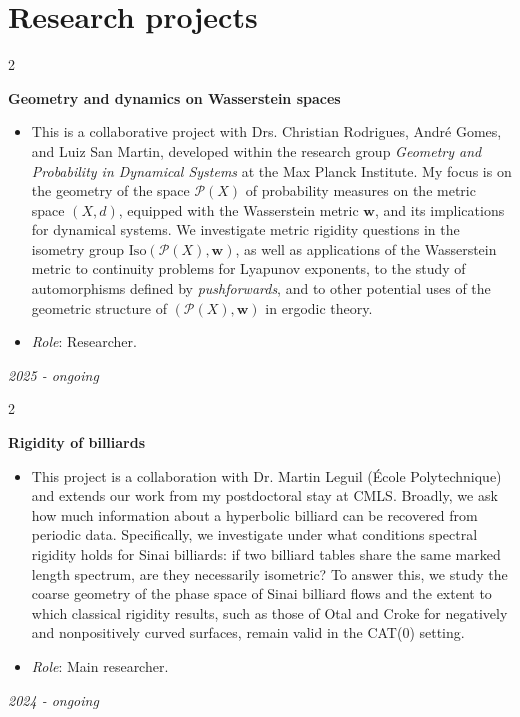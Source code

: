 \documentclass[10pt, letterpaper]{article}
\newenvironment{highlights}{
    \begin{itemize}[
        topsep=0.10 cm,
        parsep=0.10 cm,
        partopsep=0pt,
        itemsep=0pt,
        leftmargin=0.4 cm + 10pt
    ]
}{
    \end{itemize}
} %
\newenvironment{twocolentry}[2][]{
    \onecolentry
    \def\secondColumn{#2}
    \setcolumnwidth{\fill, 5 cm}
    \begin{paracol}{2}
    \small 
}{
    \switchcolumn \raggedleft \secondColumn
    \end{paracol}
    \endonecolentry
} %
\begin{document}
    \section{Research projects}
    \begin{twocolentry}{\textit{2025 - ongoing }}
        \textbf{Geometry and dynamics on Wasserstein spaces}
        \begin{highlights}
            \item This is a collaborative project with Drs. Christian Rodrigues, André Gomes, and Luiz San Martin, developed within the research group \textit{Geometry and Probability in Dynamical Systems} at the Max Planck Institute.  
            My focus is on the geometry of the space \(\mathcal{P}(X)\) of probability measures on the metric space \((X, d)\), equipped with the Wasserstein metric \(\mathbf{w}\), and its implications for dynamical systems.  
            We investigate metric rigidity questions in the isometry group \(\mathrm{Iso}(\mathcal{P}(X), \mathbf{w})\), as well as applications of the Wasserstein metric to continuity problems for Lyapunov exponents, to the study of automorphisms defined by \textit{pushforwards}, and to other potential uses of the geometric structure of \((\mathcal{P}(X), \mathbf{w})\) in ergodic theory.


            \item \textit{Role}: Researcher.
        \end{highlights}
    \end{twocolentry} \vspace{0.1cm}

    \begin{twocolentry}{\textit{2024 - ongoing }}
        \textbf{Rigidity of billiards}
        \begin{highlights}
            \item This project is a collaboration with Dr. Martin Leguil (École Polytechnique) and extends our work from my postdoctoral stay at CMLS. Broadly, we ask how much information about a hyperbolic billiard can be recovered from periodic data. Specifically, we investigate under what conditions spectral rigidity holds for Sinai billiards: if two billiard tables share the same marked length spectrum, are they necessarily isometric? To answer this, we study the coarse geometry of the phase space of Sinai billiard flows and the extent to which classical rigidity results, such as those of Otal and Croke for negatively and nonpositively curved surfaces, remain valid in the CAT(0) setting.
            \item \textit{Role}: Main researcher.
        \end{highlights}
    \end{twocolentry} \vspace{0.1cm}
    
\end{document}
